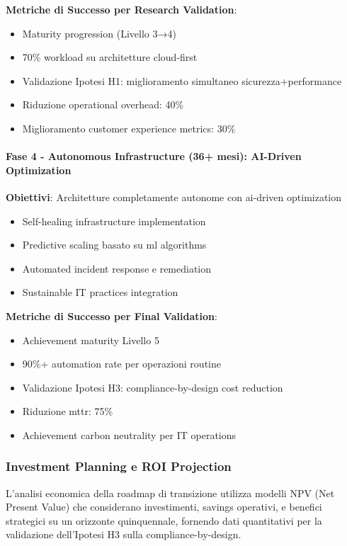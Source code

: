 \textbf{Metriche di Successo per Research Validation}:
\begin{itemize}
    \item Maturity progression (Livello 3→4)
    \item 70\% workload su architetture cloud-first
    \item Validazione Ipotesi H1: miglioramento simultaneo sicurezza+performance
    \item Riduzione operational overhead: 40\%
    \item Miglioramento customer experience metrics: 30\%
\end{itemize}

\paragraph{Fase 4 - Autonomous Infrastructure (36+ mesi): AI-Driven Optimization}

\textbf{Obiettivi}: Architetture completamente autonome con \gls{ai}-driven optimization
\begin{itemize}
    \item Self-healing infrastructure implementation
    \item Predictive scaling basato su \gls{ml} algorithms
    \item Automated incident response e remediation
    \item Sustainable IT practices integration
\end{itemize}

\textbf{Metriche di Successo per Final Validation}:
\begin{itemize}
    \item Achievement maturity Livello 5
    \item 90\%+ automation rate per operazioni routine
    \item Validazione Ipotesi H3: compliance-by-design cost reduction
    \item Riduzione \gls{mttr}: 75\%
    \item Achievement carbon neutrality per IT operations
\end{itemize}

\subsubsection{Investment Planning e ROI Projection}

L'analisi economica della roadmap di transizione utilizza modelli NPV (Net Present Value) che considerano investimenti, savings operativi, e benefici strategici su un orizzonte quinquennale, fornendo dati quantitativi per la validazione dell'Ipotesi H3 sulla compliance-by-design.

